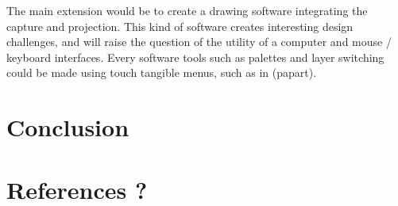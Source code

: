 \documentclass{article}
\begin{document}
The main extension would be to create a drawing software integrating the capture and projection. This kind of software creates interesting design challenges, and will raise the question of the utility of a computer and mouse / keyboard interfaces. Every software tools such as palettes and layer switching could be made using touch tangible menus, such as in (papart). 

\section{Conclusion}





\section{References ?}
\end{document}
